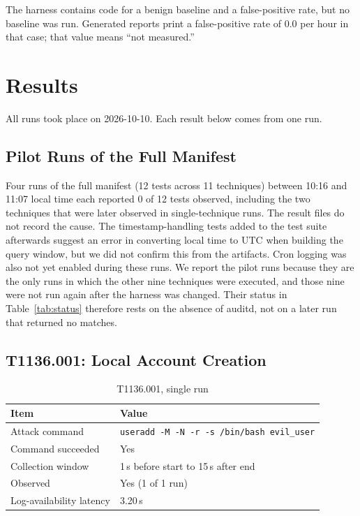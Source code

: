 \documentclass[11pt,a4paper]{article}
\begin{document}
The harness contains code for a benign baseline and a false-positive rate, but
no baseline was run. Generated reports print a false-positive rate of
0.0 per hour in that case; that value means ``not measured.''

\section{Results}

All runs took place on 2026-10-10. Each result below comes from one run.

\subsection{Pilot Runs of the Full Manifest}

Four runs of the full manifest (12 tests across 11 techniques) between 10:16
and 11:07 local time each reported 0 of 12 tests observed, including the two
techniques that were later observed in single-technique runs. The result files
do not record the cause. The timestamp-handling tests added to the test suite
afterwards suggest an error in converting local time to UTC when building the
query window, but we did not confirm this from the artifacts. Cron logging was
also not yet enabled during these runs. We report the pilot runs because they
are the only runs in which the other nine techniques were executed, and those
nine were not run again after the harness was changed. Their status in
Table~\ref{tab:status} therefore rests on the absence of auditd, not on a
later run that returned no matches.

\subsection{T1136.001: Local Account Creation}

\begin{table}[H]
    \centering
    \caption{T1136.001, single run}
    \label{tab:t1136}
    \begin{tabular}{ll}
        \toprule
        \textbf{Item} & \textbf{Value} \\
        \midrule
        Attack command & \texttt{useradd -M -N -r -s /bin/bash evil\_user} \\
        Command succeeded & Yes \\
        Collection window & 1\,s before start to 15\,s after end \\
        Observed & Yes (1 of 1 run) \\
        Log-availability latency & 3.20\,s \\
        \bottomrule
    \end{tabular}
\end{table}
\end{document}
